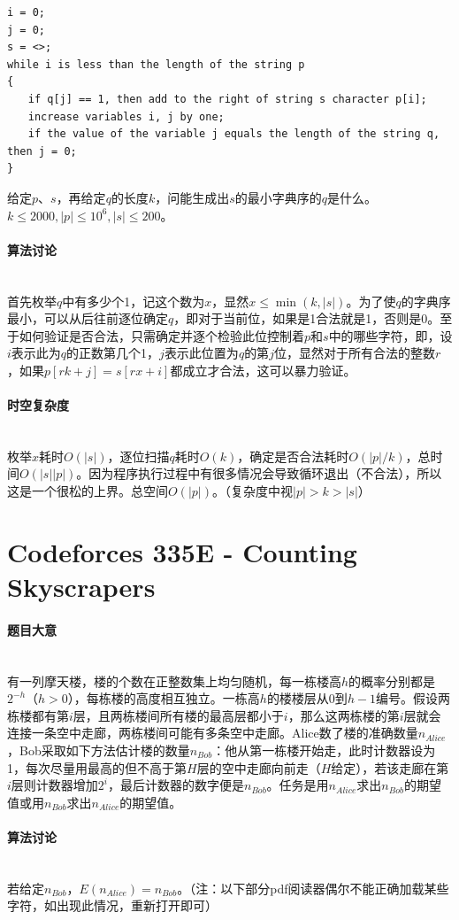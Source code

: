 \documentclass[UTF8]{ctexart}
\newcommand{\myparagraph}[1]{\paragraph{#1}\mbox{}\\}
\theoremstyle{nonumberplain}
\begin{document}
			\begin{verbatim}
i = 0;
j = 0;
s = <>;
while i is less than the length of the string p
{
　　if q[j] == 1, then add to the right of string s character p[i];
　　increase variables i, j by one;
　　if the value of the variable j equals the length of the string q, then j = 0;
}
			\end{verbatim}
			
			给定$p$、$s$，再给定$q$的长度$k$，问能生成出$s$的最小字典序的$q$是什么。$k \leq 2000, |p| \leq 10^6, |s| \leq 200$。
		
		\myparagraph{算法讨论}
		
			首先枚举$q$中有多少个1，记这个数为$x$，显然$x \leq \min(k,|s|)$。为了使$q$的字典序最小，可以从后往前逐位确定$q$，即对于当前位，如果是1合法就是1，否则是0。至于如何验证是否合法，只需确定并逐个检验此位控制着$p$和$s$中的哪些字符，即，设$i$表示此为$q$的正数第几个1，$j$表示此位置为$q$的第$j$位，显然对于所有合法的整数$r$，如果$p[rk+j]=s[rx+i]$都成立才合法，这可以暴力验证。
		
		\myparagraph{时空复杂度}
	
			枚举$x$耗时$O(|s|)$，逐位扫描$q$耗时$O(k)$，确定是否合法耗时$O(|p|/k)$，总时间$O(|s||p|)$。因为程序执行过程中有很多情况会导致循环退出（不合法），所以这是一个很松的上界。总空间$O(|p|)$。（复杂度中视$|p|>k>|s|$）
			
	\section{Codeforces 335E - Counting Skyscrapers}
	
		\myparagraph{题目大意}
		
			有一列摩天楼，楼的个数在正整数集上均匀随机，每一栋楼高$h$的概率分别都是$2^{-h}$（$h>0$），每栋楼的高度相互独立。一栋高$h$的楼楼层从0到$h-1$编号。假设两栋楼都有第$i$层，且两栋楼间所有楼的最高层都小于$i$，那么这两栋楼的第$i$层就会连接一条空中走廊，两栋楼间可能有多条空中走廊。Alice数了楼的准确数量$n_{Alice}$，Bob采取如下方法估计楼的数量$n_{Bob}$：他从第一栋楼开始走，此时计数器设为1，每次尽量用最高的但不高于第$H$层的空中走廊向前走（$H$给定），若该走廊在第$i$层则计数器增加$2^i$，最后计数器的数字便是$n_{Bob}$。任务是用$n_{Alice}$求出$n_{Bob}$的期望值或用$n_{Bob}$求出$n_{Alice}$的期望值。
		
		\myparagraph{算法讨论}
			
			若给定$n_{Bob}$，$E(n_{Alice})=n_{Bob}$。（注：以下部分pdf阅读器偶尔不能正确加载某些字符，如出现此情况，重新打开即可）
			
\end{document}
